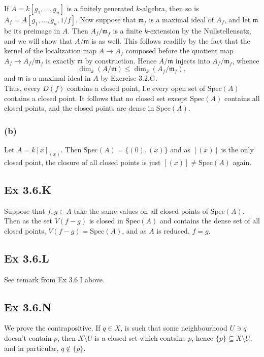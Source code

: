 \documentclass{article}
\theoremstyle{definition}
\newcommand{\Spec}{\text{Spec}}
\begin{document}
If $A = k[g_1, \ldots, g_n]$ is a finitely generated $k$-algebra, then so is
$A_f = A[g_1, \ldots, g_n, 1/f]$. Now suppose that $\mathfrak{m}_f$ is a
maximal ideal of $A_f$, and let $\mathfrak{m}$ be its preimage in $A$. Then
$A_f / \mathfrak{m}_f$ is a finite $k$-extension by the Nullstellensatz, and we
will show that $A/\mathfrak{m}$ is as well. This follows readilly by the fact
that the kernel of the localization map $A \to A_f$ composed before the
quotient map $A_f \to A_f / \mathfrak{m}_f$ is exactly $\mathfrak{m}$ by
construction. Hence $A/\mathfrak{m}$ injects into $A_f / \mathfrak{m}_f$,
whence
\[
	\dim_k(A/\mathfrak{m})
	\leq
	\dim_k(A_f/\mathfrak{m}_f),
\]
and $\mathfrak{m}$ is a maximal ideal in $A$ by Exercise 3.2.G. \\

Thus, every $D(f)$ contains a closed point, I.e every open set of $\Spec(A)$
contains a closed point. It follows that no closed set except $\Spec(A)$
contains all closed points, and the closed points are dense in $\Spec(A)$.

\subsubsection*{(b)}

Let $A = k[x]_{(x)}$. Then $\Spec(A) = \{(0), (x)\}$ and as $[(x)]$ is the only
closed point, the closure of all closed points is just $[(x)] \not = \Spec(A)$
again.

\subsection*{Ex 3.6.K}

Suppose that $f, g \in A$ take the same values on all closed points of
$\Spec(A)$. Then as the set $V(f - g)$ is closed in $\Spec(A)$ and contains the
dense set of all closed points, $V(f - g) = \Spec(A)$, and as $A$ is reduced,
$f = g$.

\subsection*{Ex 3.6.L}

See remark from Ex 3.6.I above.

\subsection*{Ex 3.6.N}

We prove the contrapositive. If $q \in X$, is such that some neighbourhood $U
	\ni q$ doesn't contain $p$, then $X \setminus U$ is a closed set which contains
$p$, hence $\overline{\{p\}} \subseteq X \setminus U$, and in particular, $q
	\not \in \overline{\{p\}}$. \\
\end{document}
